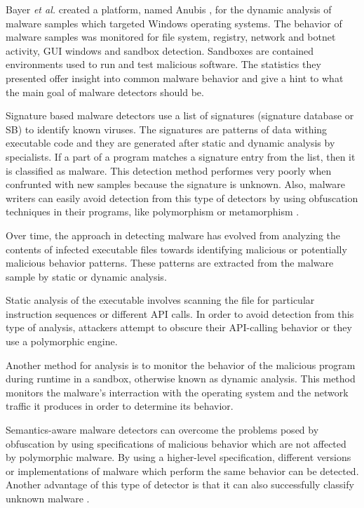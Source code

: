 Bayer \textit{et al.} created a platform, named Anubis \cite{anubis-platform}, for the dynamic analysis of malware samples which targeted Windows operating systems. The behavior of malware samples was monitored for file system, registry, network and botnet activity, GUI windows and sandbox detection. Sandboxes are contained environments used to run and test malicious software. The statistics they presented offer insight into common malware behavior and give a hint to what the main goal of malware detectors should be.

Signature based malware detectors use a list of signatures (signature database or SB) to identify known viruses. The signatures are patterns of data withing executable code and they are generated after static and dynamic analysis by specialists. If a part of a program matches a signature entry from the list, then it is classified as malware. This detection method performes very poorly when confrunted with new samples because the signature is unknown. Also, malware writers can easily avoid detection from this type of detectors by using obfuscation techniques in their programs, like polymorphism or metamorphism \cite{mining-specifications}. 

Over time, the approach in detecting malware has evolved from analyzing the contents of infected executable files towards identifying malicious or potentially malicious behavior patterns. These patterns are extracted from the malware sample by static or dynamic analysis.

Static analysis of the executable involves scanning the file for particular instruction sequences or different API calls. In order to avoid detection from this type of analysis, attackers attempt to obscure their API-calling behavior or they use a polymorphic engine.

Another method for analysis is to monitor the behavior of the malicious program during runtime in a sandbox, otherwise known as dynamic analysis. This method monitors the malware's interraction with the operating system and the network traffic it produces in order to determine its behavior.

Semantics-aware malware detectors can overcome the problems posed by obfuscation by using specifications of malicious behavior which are not affected by polymorphic malware. By using a higher-level specification, different versions or implementations of malware which perform the same behavior can be detected. Another advantage of this type of detector is that it can also successfully classify unknown malware \cite{semantics-based-detection}.

